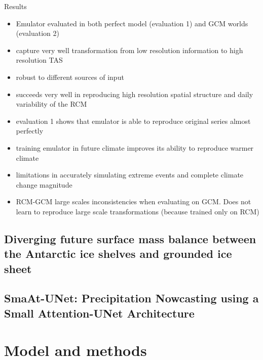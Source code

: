 \documentclass[a4paper,11pt,oneside]{report}
\begin{document}
Results
\begin{itemize}
    \item Emulator evaluated in both perfect model (evaluation 1) and GCM worlds (evaluation 2)
    \item capture very well transformation from low resolution information to high resolution TAS
    \item robust to different sources of input
    \item succeeds very well in reproducing high resolution spatial structure and daily variability of the RCM
    \item evaluation 1 shows that emulator is able to reproduce original series almost perfectly
    \item training emulator in future climate improves its ability to reproduce warmer climate
    \item limitations in accurately simulating extreme events and complete climate change magnitude
    \item RCM-GCM large scales inconsistencies when evaluating on GCM. Does not learn to reproduce large scale transformations (because trained only on RCM)
\end{itemize}
\section{Diverging future surface mass balance between the Antarctic ice shelves and grounded ice sheet \cite{Kittel}}

\section{SmaAt-UNet: Precipitation Nowcasting using a Small Attention-UNet Architecture~\cite{smatunet}}



\chapter{Model and methods}


\end{document}
